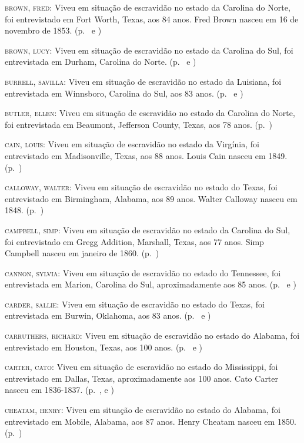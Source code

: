 \begin{Parskip}
\textsc{brown, fred:} Viveu em situação de escravidão no estado da Carolina do Norte, foi
entrevistado em Fort Worth, Texas, aos 84 anos. Fred Brown nasceu em 16
de novembro de 1853. (p.~\pageref{ref35} e \pageref{ref36})

\textsc{brown, lucy:} Viveu em situação de escravidão no estado da Carolina do Sul, foi
entrevistada em Durham, Carolina do Norte. (p.~\pageref{ref37} e \pageref{ref38})

\textsc{burrell, savilla:} Viveu em situação de escravidão no estado da Luisiana, foi
entrevistada em Winnsboro, Carolina do Sul, aos 83 anos. (p.~\pageref{ref39} e \pageref{ref40})

\textsc{butler, ellen:} Viveu em situação de escravidão no estado da Carolina do Norte, foi
entrevistada em Beaumont, Jefferson County, Texas, aos 78 anos. (p.~\pageref{ref41})

\textsc{cain, louis:} Viveu em situação de escravidão no estado da Virgínia, foi entrevistado em
Madisonville, Texas, aos 88 anos. Louis Cain nasceu em 1849. (p.~\pageref{ref42})

\textsc{calloway, walter:} Viveu em situação de escravidão no estado do Texas, foi entrevistado
em Birmingham, Alabama, aos 89 anos. Walter Calloway nasceu em 1848. (p.~\pageref{ref43})

\textsc{campbell, simp:} Viveu em situação de escravidão no estado da Carolina do Sul, foi
entrevistado em Gregg Addition, Marshall, Texas, aos 77 anos. Simp
Campbell nasceu em janeiro de 1860. (p.~\pageref{ref44})

\textsc{cannon, sylvia:} Viveu em situação de escravidão no estado do Tennessee, foi
entrevistada em Marion, Carolina do Sul, aproximadamente aos 85 anos. (p.~\pageref{ref45} e \pageref{ref46})

\textsc{carder, sallie:} Viveu em situação de escravidão no estado do Texas, foi entrevistada em
Burwin, Oklahoma, aos 83 anos. (p.~\pageref{ref47} e \pageref{ref48}) 

\textsc{carruthers, richard:} Viveu em situação de escravidão no estado do Alabama, foi
entrevistado em Houston, Texas, aos 100 anos. (p.~\pageref{ref49} e \pageref{ref50}) 

\textsc{carter, cato:} Viveu em situação de escravidão no estado do Mississippi, foi
entrevistado em Dallas, Texas, aproximadamente aos 100 anos. Cato Carter
nasceu em 1836-1837. (p.~\pageref{ref51}, \pageref{ref52} e \pageref{ref53}) 

\textsc{cheatam, henry:} Viveu em situação de escravidão no estado do Alabama, foi entrevistado
em Mobile, Alabama, aos 87 anos. Henry Cheatam nasceu em 1850. (p.~\pageref{ref54})


\end{Parskip}
